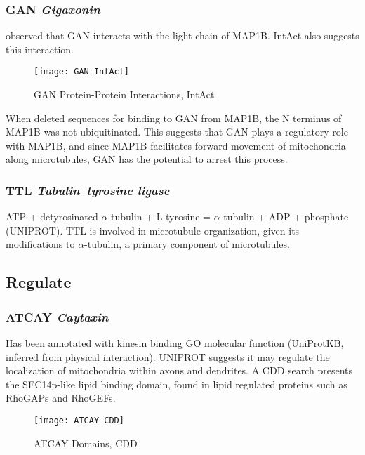 \subsubsection{GAN \textit{Gigaxonin}}

\cite{Allen2005} observed that GAN interacts with the light chain of MAP1B.
IntAct also suggests this interaction.

\begin{figure}[h!]
  \centering
  \texttt{[image: GAN-IntAct]}
  \caption{GAN Protein-Protein Interactions, IntAct}
\end{figure}

When \citeauthor{Allen2005} deleted sequences for binding to GAN from MAP1B,
the N terminus of MAP1B was not ubiquitinated. This suggests that GAN plays
a regulatory role with MAP1B, and since MAP1B facilitates forward movement
of mitochondria along microtubules, GAN has the potential to arrest this
process.

\subsubsection{TTL \textit{Tubulin--tyrosine ligase}}

ATP + detyrosinated $\alpha$-tubulin + L-tyrosine = $\alpha$-tubulin + ADP +
phosphate (UNIPROT). TTL is involved in microtubule organization, given its
modifications to $\alpha$-tubulin, a primary component of microtubules.

\subsection{Regulate}

\subsubsection{ATCAY \textit{Caytaxin}}

Has been annotated with \href{http://www.ebi.ac.uk/QuickGO/GTerm?id=GO:0019894}{kinesin binding}
GO molecular function (UniProtKB, inferred from physical interaction).
UNIPROT suggests it may regulate the localization of mitochondria within
axons and dendrites. A CDD search presents the SEC14p-like lipid binding
domain, found in lipid regulated proteins such as RhoGAPs and RhoGEFs.

\begin{figure}[h!]
  \texttt{[image: ATCAY-CDD]}
  \caption{ATCAY Domains, CDD}
\end{figure}

